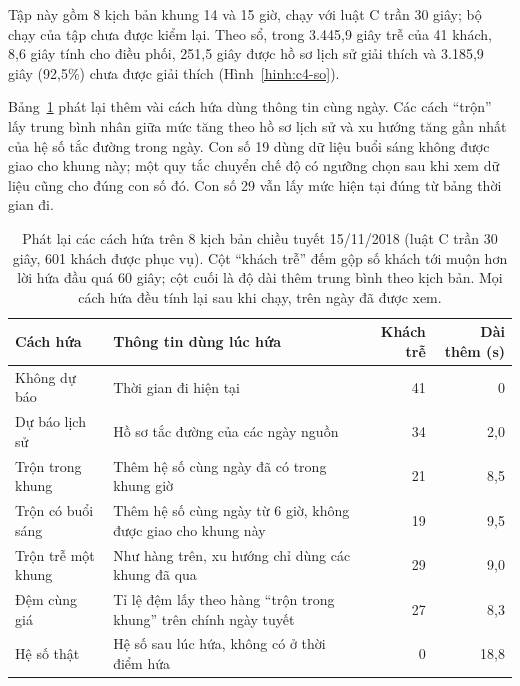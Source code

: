 Tập này gồm 8 kịch bản khung 14 và 15 giờ, chạy với luật C trần 30 giây; bộ chạy của tập chưa được kiểm lại. Theo sổ,
trong 3.445,9 giây trễ của 41 khách, 8,6 giây tính cho điều phối, 251,5 giây được hồ sơ lịch sử giải thích và 3.185,9
giây (92,5\%) chưa được giải thích (Hình~\ref{hinh:c4-so}).

Bảng~\ref{bang:c4-tuyet} phát lại thêm vài cách hứa dùng thông tin cùng ngày. Các cách ``trộn'' lấy trung bình nhân
giữa mức tăng theo hồ sơ lịch sử và xu hướng tăng gần nhất của hệ số tắc đường trong ngày. Con số 19 dùng dữ liệu
buổi sáng không được giao cho khung này; một quy tắc chuyển chế độ có ngưỡng chọn sau khi xem dữ liệu cũng cho đúng
con số đó. Con số 29 vẫn lấy mức hiện tại đúng từ bảng thời gian đi.

\begin{table}[htbp]
\centering
\caption{Phát lại các cách hứa trên 8 kịch bản chiều tuyết 15/11/2018 (luật C trần 30 giây, 601 khách được phục
vụ). Cột ``khách trễ'' đếm gộp số khách tới muộn hơn lời hứa đầu quá 60 giây; cột cuối là độ dài thêm trung bình
theo kịch bản. Mọi cách hứa đều tính lại sau khi chạy, trên ngày đã được xem.}
\label{bang:c4-tuyet}
\small
\begin{tabular}{@{}p{3.6cm}p{7.0cm}rr@{}}
\toprule
\textbf{Cách hứa} & \textbf{Thông tin dùng lúc hứa} & \textbf{Khách trễ} & \textbf{Dài thêm (s)}\\
\midrule
Không dự báo & Thời gian đi hiện tại & 41 & 0\\
Dự báo lịch sử & Hồ sơ tắc đường của các ngày nguồn & 34 & 2,0\\
Trộn trong khung & Thêm hệ số cùng ngày đã có trong khung giờ & 21 & 8,5\\
Trộn có buổi sáng & Thêm hệ số cùng ngày từ 6 giờ, không được giao cho khung này & 19 & 9,5\\
Trộn trễ một khung & Như hàng trên, xu hướng chỉ dùng các khung đã qua & 29 & 9,0\\
Đệm cùng giá & Tỉ lệ đệm lấy theo hàng ``trộn trong khung'' trên chính ngày tuyết & 27 & 8,3\\
Hệ số thật & Hệ số sau lúc hứa, không có ở thời điểm hứa & 0 & 18,8\\
\bottomrule
\end{tabular}
\end{table}

